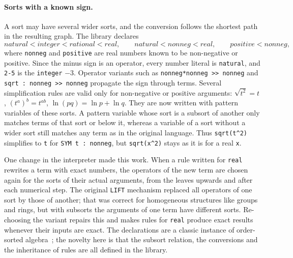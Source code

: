 \documentclass[11pt,a4paper]{article}
\begin{document}
\paragraph{Sorts with a known sign.} A sort may have several wider sorts,
and the conversion follows the shortest path in the resulting graph. The
library declares
\[
\mathit{natural} < \mathit{integer} < \mathit{rational} < \mathit{real},\qquad
\mathit{natural} < \mathit{nonneg} < \mathit{real},\qquad
\mathit{positive} < \mathit{nonneg},
\]
where \texttt{nonneg} and \texttt{positive} are real numbers known to be
non-negative or positive. Since the minus sign is an operator, every number
literal is \texttt{natural}, and \texttt{2-5} is the \texttt{integer} $-3$.
Operator variants such as \texttt{nonneg*nonneg >> nonneg} and
\texttt{sqrt : nonneg >> nonneg} propagate the sign through terms. Several
simplification rules are valid only for non-negative or positive
arguments: $\sqrt{t^2}=t$, $(t^a)^b=t^{ab}$, $\ln(pq)=\ln p+\ln q$. They
are now written with pattern variables of these sorts. A pattern variable whose
sort is a subsort of another only matches terms of that sort or below it,
whereas a variable of a sort without a wider sort still matches any term
as in the original language. Thus \texttt{sqrt(t\^{}2)} simplifies to \texttt{t} for
\texttt{SYM t : nonneg}, but \texttt{sqrt(x\^{}2)} stays as it is for a
real \texttt{x}.

One change in the interpreter made this work. When a rule written for
\texttt{real} rewrites a term with exact numbers, the operators of the new
term are chosen again for the sorts of their actual arguments, from the
leaves upwards and after each numerical step. The original \texttt{LIFT}
mechanism replaced all operators of one sort by those of another; that was
correct for homogeneous structures like groups and rings, but with
subsorts the arguments of one term have different sorts. Re-choosing the
variant repairs this and makes rules for \texttt{real} produce exact
results whenever their inputs are exact. The declarations are a classic
instance of order-sorted algebra~\cite{goguen1992osa}; the novelty here is
that the subsort relation, the conversions and the inheritance of rules
are all defined in the library.
\end{document}
